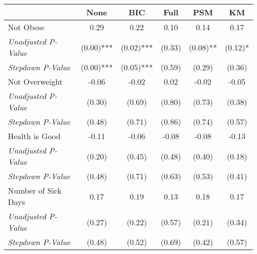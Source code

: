 \begin{tabular}{l c c c c c}
\toprule
 & None & BIC & Full & PSM & KM \\
\midrule
Not Obese & 0.29 & 0.22 & 0.10 & 0.14 & 0.17 \\
\quad \textit{Unadjusted P-Value} & (0.00)*** & (0.02)*** & (0.33) & (0.08)** & (0.12)* \\
\quad \textit{Stepdown P-Value} & (0.00)*** & (0.05)*** & (0.59) & (0.29) & (0.36) \\
Not Overweight & -0.06 & -0.02 & 0.02 & -0.02 & -0.05 \\
\quad \textit{Unadjusted P-Value} & (0.30) & (0.69) & (0.80) & (0.73) & (0.38) \\
\quad \textit{Stepdown P-Value} & (0.48) & (0.71) & (0.86) & (0.74) & (0.57) \\
Health is Good & -0.11 & -0.06 & -0.08 & -0.08 & -0.13 \\
\quad \textit{Unadjusted P-Value} & (0.20) & (0.45) & (0.48) & (0.40) & (0.18) \\
\quad \textit{Stepdown P-Value} & (0.48) & (0.71) & (0.63) & (0.53) & (0.41) \\
Number of Sick Days & 0.17 & 0.19 & 0.13 & 0.18 & 0.17 \\
\quad \textit{Unadjusted P-Value} & (0.27) & (0.22) & (0.57) & (0.21) & (0.34) \\
\quad \textit{Stepdown P-Value} & (0.48) & (0.52) & (0.69) & (0.42) & (0.57) \\
\bottomrule
\end{tabular}
